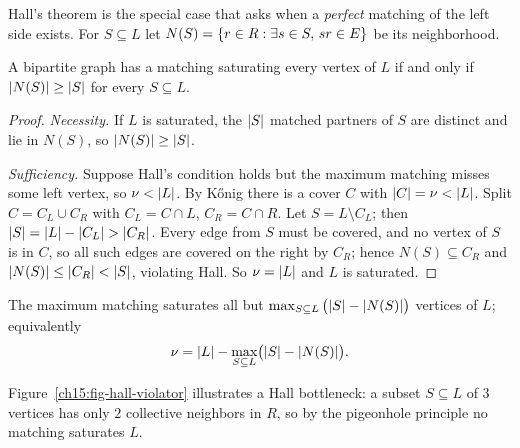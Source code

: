 Hall's theorem is the special case that asks when a \emph{perfect} matching of
the left side exists. For $S\subseteq L$ let $N(S)=\{r\in R: \exists s\in
S,\,sr\in E\}$ be its neighborhood.

\begin{theorem}
\label{ch15:thm-hall}
A bipartite graph has a matching saturating every vertex of $L$ if and only if
$\lvert N(S)\rvert\ge\lvert S\rvert$ for every $S\subseteq L$.
\end{theorem}

\begin{proof}
\emph{Necessity.} If $L$ is saturated, the $\lvert S\rvert$ matched partners of $S$ are
distinct and lie in $N(S)$, so $\lvert N(S)\rvert\ge\lvert S\rvert$.

\emph{Sufficiency.} Suppose Hall's condition holds but the maximum matching
misses some left vertex, so $\nu<\lvert L\rvert$. By K\H{o}nig there is a cover $C$ with
$\lvert C\rvert=\nu<\lvert L\rvert$. Split $C=C_L\cup C_R$ with $C_L=C\cap L$, $C_R=C\cap R$.
Let $S=L\setminus C_L$; then $\lvert S\rvert=\lvert L\rvert-\lvert C_L\rvert>\lvert C_R\rvert$. Every edge
from $S$ must be covered, and no vertex of $S$ is in $C$, so all such edges are
covered on the right by $C_R$; hence $N(S)\subseteq C_R$ and $\lvert N(S)\rvert\le
\lvert C_R\rvert<\lvert S\rvert$, violating Hall. So $\nu=\lvert L\rvert$ and $L$ is saturated.
\end{proof}

\begin{corollary}
\label{ch15:cor-defect}
The maximum matching saturates all but $\max_{S\subseteq L}\,\bigl(\lvert S\rvert-
\lvert N(S)\rvert\bigr)$ vertices of $L$; equivalently
\[
\nu=\lvert L\rvert-\max_{S\subseteq L}\bigl(\lvert S\rvert-\lvert N(S)\rvert\bigr).
\]
\end{corollary}

Figure~\ref{ch15:fig-hall-violator} illustrates a Hall bottleneck: a subset $S\subseteq L$ of $3$ vertices has only $2$ collective neighbors in $R$, so by the pigeonhole principle no matching saturates $L$.


